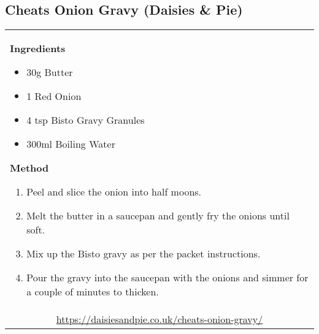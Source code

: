 \documentclass[web-recipes.tex]{subfiles}
\begin{document}
\renewcommand{\mytitle}{Cheats Onion Gravy (Daisies \& Pie)}
\renewcommand{\myurl}{https://daisiesandpie.co.uk/cheats-onion-gravy/}
    \begin{mdframed}[nobreak]
      \section{\mytitle}
      \begin{tabular}{l}
        \begin{minipage}[t]{0.35\textwidth}
          {\sffamily\bfseries Ingredients}\vspace{0.5ex}
              \begin{itemize}
                \item 30g Butter
                \item 1 Red Onion
                \item 4 tsp Bisto Gravy Granules
                \item 300ml Boiling Water
              \end{itemize}
        \end{minipage}
        \qquad
        \begin{minipage}[t]{0.55\textwidth}
          {\sffamily\bfseries Method}\vspace{0.5ex}
          \begin{enumerate}
            \item Peel and slice the onion into half moons.
            \item Melt the butter in a saucepan and gently fry the onions until
              soft.
            \item Mix up the Bisto gravy as per the packet instructions.
            \item Pour the gravy into the saucepan with the onions and simmer
              for a couple of minutes to thicken.
          \end{enumerate}
        \end{minipage} \vspace{3ex}\\
        \multicolumn{1}{c}{\small\ttfamily \url{\myurl}} \\
      \end{tabular}
    \end{mdframed}
    
\end{document}
